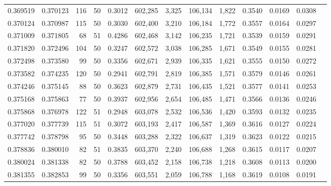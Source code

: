 \begin{tabular}{rrrrrrrrrrrrr}
0.369519 & 0.370123 &   116 &  50 &                                     0.3012 & 602,285 &   3,325 & 106,134 &   1,822 & 0.3540 & 0.0169 & 0.0308 \\
0.370124 & 0.370987 &   115 &  50 &                                     0.3030 & 602,400 &   3,210 & 106,184 &   1,772 & 0.3557 & 0.0164 & 0.0297 \\
0.371009 & 0.371805 &    68 &  51 &                                     0.4286 & 602,468 &   3,142 & 106,235 &   1,721 & 0.3539 & 0.0159 & 0.0291 \\
0.371820 & 0.372496 &   104 &  50 &                                     0.3247 & 602,572 &   3,038 & 106,285 &   1,671 & 0.3549 & 0.0155 & 0.0281 \\
0.372498 & 0.373580 &    99 &  50 &                                     0.3356 & 602,671 &   2,939 & 106,335 &   1,621 & 0.3555 & 0.0150 & 0.0272 \\
0.373582 & 0.374235 &   120 &  50 &                                     0.2941 & 602,791 &   2,819 & 106,385 &   1,571 & 0.3579 & 0.0146 & 0.0261 \\
0.374246 & 0.375145 &    88 &  50 &                                     0.3623 & 602,879 &   2,731 & 106,435 &   1,521 & 0.3577 & 0.0141 & 0.0253 \\
0.375168 & 0.375863 &    77 &  50 &                                     0.3937 & 602,956 &   2,654 & 106,485 &   1,471 & 0.3566 & 0.0136 & 0.0246 \\
0.375868 & 0.376978 &   122 &  51 &                                     0.2948 & 603,078 &   2,532 & 106,536 &   1,420 & 0.3593 & 0.0132 & 0.0235 \\
0.377020 & 0.377739 &   115 &  51 &                                     0.3072 & 603,193 &   2,417 & 106,587 &   1,369 & 0.3616 & 0.0127 & 0.0224 \\
0.377742 & 0.378798 &    95 &  50 &                                     0.3448 & 603,288 &   2,322 & 106,637 &   1,319 & 0.3623 & 0.0122 & 0.0215 \\
0.378836 & 0.380010 &    82 &  51 &                                     0.3835 & 603,370 &   2,240 & 106,688 &   1,268 & 0.3615 & 0.0117 & 0.0207 \\
0.380024 & 0.381338 &    82 &  50 &                                     0.3788 & 603,452 &   2,158 & 106,738 &   1,218 & 0.3608 & 0.0113 & 0.0200 \\
0.381355 & 0.382853 &    99 &  50 &                                     0.3356 & 603,551 &   2,059 & 106,788 &   1,168 & 0.3619 & 0.0108 & 0.0191 \\

\end{tabular}
